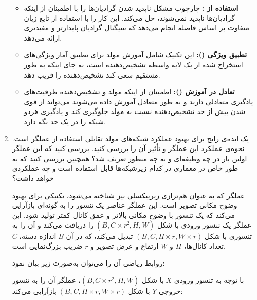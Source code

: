\begin{enumerate}
	\begin{qsolve}
		\begin{itemize}
			\item \textbf{استفاده از : }
چارچوب  مشکل ناپدید شدن گرادیان‌ها را با اطمینان از اینکه گرادیان‌ها ناپدید نمی‌شوند، حل می‌کند. این کار را با استفاده از تابع زیان متفاوت بر اساس فاصله  انجام می‌دهد که سیگنال گرادیان پایدارتر و مفیدتری ارائه می‌دهد.
			
			
			\item \textbf{تطبیق ویژگی (): }
این تکنیک شامل آموزش مولد برای تطبیق آمار ویژگی‌های استخراج شده از یک لایه واسطه تشخیص‌دهنده است، به جای اینکه به طور مستقیم سعی کند تشخیص‌دهنده را فریب دهد.
			
			
			\item \textbf{تعادل در آموزش (): }
اطمینان از اینکه مولد و تشخیص‌دهنده ظرفیت‌های یادگیری متعادلی دارند و به طور متعادل آموزش داده می‌شوند می‌تواند از قوی شدن بیش از حد تشخیص‌دهنده نسبت به مولد جلوگیری کند و یادگیری هردو شبکه را در یک حد نگه دارد.
		\end{itemize}
	\end{qsolve}




	
	
	
	
	
	\item 
یک ایده‌ی رایج برای بهبود عملکرد شبکه‌های مولد تقابلی استفاده از عملگر  است. نحوه‌ی عملکرد این عملگر و تأثیر آن را بررسی کنید. بررسی کنید که این عملگر اولین بار در چه وظیفه‌ای و به چه منظور تعریف شد؟ همچنین بررسی کنید که به طور خاص در معماری  در کدام زیرشبکه‌ها قابل استفاده است و چه عملکردی خواهد داشت؟

	\begin{qsolve}
عملگر  که به عنوان هم‌ترازی زیرپیکسلی نیز شناخته می‌شود، تکنیکی برای بهبود وضوح مکانی تصویر است. این عملگر عناصر یک تنسور را به گونه‌ای بازآرایی می‌کند که یک تنسور با وضوح مکانی بالاتر و عمق کانال کمتر تولید شود. این عملگر یک تنسور ورودی با شکل $(B, C \times r^2, H, W)$ را دریافت می‌کند و آن را به تنسوری با شکل $(B, C, H \times r, W \times r)$ تبدیل می‌کند، که در آن $B$ اندازه دسته، $C$ تعداد کانال‌ها، $H$ و $W$ ارتفاع و عرض تصویر و $r$ ضریب بزرگ‌نمایی است.

روابط ریاضی آن را می‌توان به‌صورت زیر بیان نمود:

با توجه به تنسور ورودی $X$ با شکل $(B, C \times r^2, H, W)$، عملگر  آن را به تنسور خروجی $Y$ با شکل $(B, C, H \times r, W \times r)$ بازآرایی می‌کند:


\end{qsolve}
\end{enumerate}
